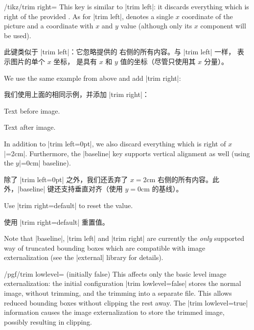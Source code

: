 \begin{key}{/tikz/trim right=}
    This key is similar to |trim left|: it discards everything which is right
    of the provided . As for |trim left|,
     denotes a single $x$ coordinate of the picture and
     a coordinate with $x$ and $y$ value (although only its
    $x$ component will be used).

    此键类似于 |trim left|：它忽略提供的  右侧的所有内容。与 |trim left| 一样， 表示图片的单个 $x$ 坐标， 是具有 $x$ 和 $y$ 值的坐标（尽管只使用其 $x$ 分量）。



    We use the same example from above and add |trim right|:
    
    我们使用上面的相同示例，并添加 |trim right|：

\begin{codeexample}[]
Text before image.%
Text after image.
\end{codeexample}
    In addition to |trim left=0pt|, we also discard everything which is right
    of $x$|=2cm|. Furthermore, the |baseline| key supports vertical alignment
    as well (using the $y$|=0cm| baseline).

    除了 |trim left=0pt| 之外，我们还丢弃了 $x=2\mathrm{cm}$ 右侧的所有内容。此外，|baseline| 键还支持垂直对齐（使用 $y=0\mathrm{cm}$ 的基线）。


    Use |trim right=default| to reset the value.

    使用 |trim right=default| 重置值。

\end{key}

Note that |baseline|, |trim left| and |trim right| are currently the
\emph{only} supported way of truncated bounding boxes which are compatible with
image externalization (see the |external| library for details).

\begin{key}{/pgf/trim lowlevel= (initially false)}
    This affects only the basic level image externalization: the initial
    configuration |trim lowlevel=false| stores the normal image, without
    trimming, and the trimming into a separate file. This allows reduced
    bounding boxes without clipping the rest away. The |trim lowlevel=true|
    information causes the image externalization to store the trimmed image,
    possibly resulting in clipping.
\end{key}


